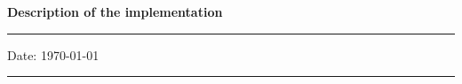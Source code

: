 {\large {\bf Description of the implementation}}


\noindent\rule[0.5ex]{\linewidth}{1pt}

\noindent 

\noindent Date: \today

\noindent\rule[0.5ex]{\linewidth}{1pt}



